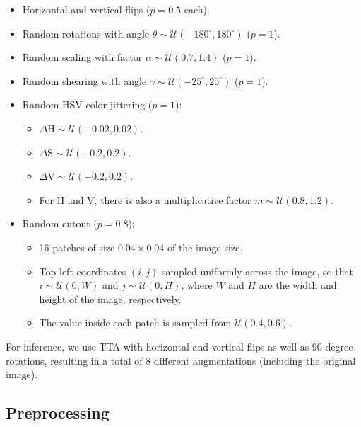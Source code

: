 \documentclass{article}
\begin{document}
\begin{itemize}
    \item Horizontal and vertical flips ($p=0.5$ each).
    \item Random rotations with angle $\theta \sim \mathcal{U}(-180^\circ, 180^\circ)$ ($p=1$).
    \item Random scaling with factor $\alpha \sim \mathcal{U}(0.7, 1.4)$ ($p=1$).
    \item Random shearing with angle $\gamma \sim \mathcal{U}(-25^\circ, 25^\circ)$ ($p=1$).
    \item Random \gls{HSV} color jittering ($p=1$):
        \begin{itemize}
            \item $\Delta\text{H}  \sim \mathcal{U}(-0.02, 0.02)$.
            \item $\Delta\text{S} \sim \mathcal{U}(-0.2, 0.2)$.
            \item $\Delta\text{V} \sim \mathcal{U}(-0.2, 0.2)$.
            \item For H and V, there is also a multiplicative factor $m \sim \mathcal{U}(0.8, 1.2)$.
        \end{itemize}
    \item Random cutout ($p=0.8$):
        \begin{itemize}
            \item 16 patches of size $0.04\times0.04$ of the image size.
            \item Top left coordinates $(i,j)$ sampled uniformly across the image, so that $i \sim \mathcal{U}(0, W)$ and $j \sim \mathcal{U}(0, H)$, where $W$ and $H$ are the width and height of the image, respectively.
            \item The value inside each patch is sampled from $\mathcal{U}(0.4, 0.6)$.
        \end{itemize}
\end{itemize}


For inference, we use \gls{TTA} with horizontal and vertical flips as well as 90-degree rotations, resulting in a total of 8 different augmentations (including the original image).


\subsection{Preprocessing}
\end{document}
